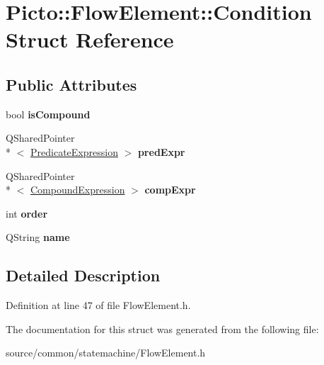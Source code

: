 \hypertarget{struct_picto_1_1_flow_element_1_1_condition}{\section{Picto\-:\-:Flow\-Element\-:\-:Condition Struct Reference}
\label{struct_picto_1_1_flow_element_1_1_condition}
}
\subsection*{Public Attributes}
\begin{DoxyCompactItemize}
\item 
\hypertarget{struct_picto_1_1_flow_element_1_1_condition_a3085f39dafde35f05d6f2a305fcbb25f}{bool {\bfseries is\-Compound}}\label{struct_picto_1_1_flow_element_1_1_condition_a3085f39dafde35f05d6f2a305fcbb25f}

\item 
\hypertarget{struct_picto_1_1_flow_element_1_1_condition_a1bfc4384755609fe651b34be68391688}{Q\-Shared\-Pointer\\*
$<$ \hyperlink{class_picto_1_1_predicate_expression}{Predicate\-Expression} $>$ {\bfseries pred\-Expr}}\label{struct_picto_1_1_flow_element_1_1_condition_a1bfc4384755609fe651b34be68391688}

\item 
\hypertarget{struct_picto_1_1_flow_element_1_1_condition_a8f9758491ea6749397c50da99a94f832}{Q\-Shared\-Pointer\\*
$<$ \hyperlink{class_picto_1_1_compound_expression}{Compound\-Expression} $>$ {\bfseries comp\-Expr}}\label{struct_picto_1_1_flow_element_1_1_condition_a8f9758491ea6749397c50da99a94f832}

\item 
\hypertarget{struct_picto_1_1_flow_element_1_1_condition_a9181cfad334983397d6c7a2e73386fb1}{int {\bfseries order}}\label{struct_picto_1_1_flow_element_1_1_condition_a9181cfad334983397d6c7a2e73386fb1}

\item 
\hypertarget{struct_picto_1_1_flow_element_1_1_condition_a04fd56eb8c42718c8df1ab4cf32d4f85}{Q\-String {\bfseries name}}\label{struct_picto_1_1_flow_element_1_1_condition_a04fd56eb8c42718c8df1ab4cf32d4f85}

\end{DoxyCompactItemize}


\subsection{Detailed Description}


Definition at line 47 of file Flow\-Element.\-h.



The documentation for this struct was generated from the following file\-:\begin{DoxyCompactItemize}
\item 
source/common/statemachine/Flow\-Element.\-h\end{DoxyCompactItemize}
